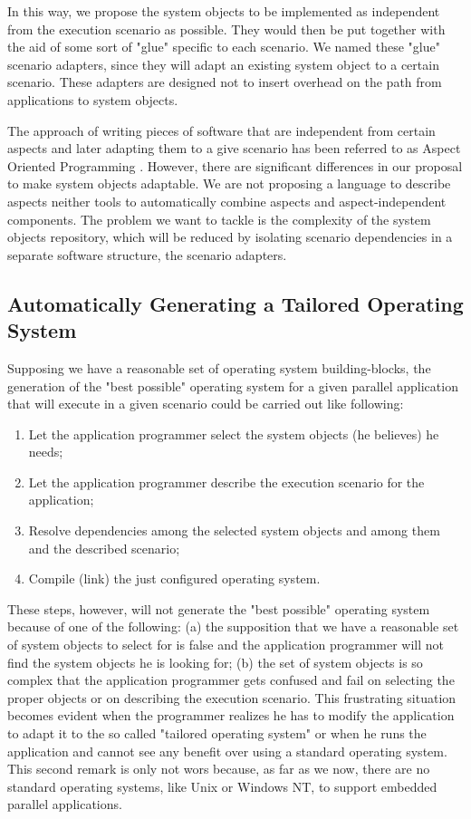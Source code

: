 \documentclass[11pt]{article}
\begin{document}
	In this way, we propose the system objects to be implemented as independent from the execution scenario as possible. They would then be put together with the aid of some sort of "glue" specific to each scenario. We named these "glue" scenario adapters, since they will adapt an existing system object to a certain scenario. These adapters are designed not to insert overhead on the path from applications to system objects.

	The approach of writing pieces of software that are independent from certain aspects and later adapting them to a give scenario has been referred to as Aspect Oriented Programming \cite{Kiczales:97}. However, there are significant differences in our proposal to make system objects adaptable. We are not proposing a language to describe aspects neither tools to automatically combine  aspects and aspect-independent components.  The problem we want to tackle is the complexity of the system objects repository, which will be reduced by isolating scenario dependencies in a separate software structure, the scenario adapters.


\subsection*{Automatically Generating  a Tailored Operating System}

	Supposing we have a reasonable set of operating system building-blocks, the generation of the "best possible" operating system for a given parallel application that will execute in a given scenario could be carried out like following:

\begin{enumerate}
\setlength{\parskip}{0cm}
\item Let the application programmer select the system objects (he believes) he needs;
\item Let the application programmer describe the execution scenario for the application;
\item Resolve dependencies among the selected system objects and among them and the described scenario;
\item Compile (link) the just configured operating system.
\end{enumerate}
\setlength{\parskip}{1.5ex}

	These steps, however, will not generate the "best possible" operating system because of one of the following: (a) the supposition that we have a reasonable set of system objects to select for is false and the application programmer will not find the system objects he is looking for; (b) the set of system objects is so complex that the application programmer gets confused and fail on selecting the proper objects or on describing the execution scenario. This frustrating situation becomes evident when the programmer realizes he has to modify the application to adapt it to the so called "tailored operating system" or when he runs the application and cannot see any benefit over using a standard operating system. This second remark is only not wors because, as far as we now, there are no standard operating systems, like Unix or Windows NT, to support embedded parallel applications.
\end{document}

